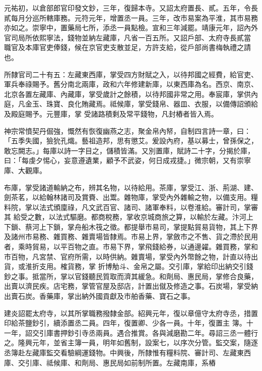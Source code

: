 \begin{pinyinscope}
 元祐初，以倉部郎官印發文鈔，三年，復歸本寺。又詔太府置長、貳。五年，令長貳每月分巡所轄庫務。元符元年，增置丞一員。三年，改市易案為平淮，其市易務亦如之。崇寧中，置藥局七所，添丞一員點檢。宣和三年減罷。靖康元年，詔內外官司局所依熙寧法，錢物並納左藏庫，凡省一百五所。又詔戶部、太府寺長貳當
 職官及本庫官吏俸錢，候在京官吏支散並足，方許支給，從戶部尚書梅執禮之請也。



 所隸官司二十有五：左藏東西庫，掌受四方財賦之入，以待邦國之經費，給官吏、軍兵奉祿賜予。舊分南北兩庫，政和六年修建新庫，以東西庫為名。西京、南京、北京各置左藏庫、內藏庫，掌受歲計之餘積，以待邦國非常之用。奉宸庫，掌供內庭，凡金玉、珠寶、良化賄藏焉。祗候庫，掌受錢帛、器皿、衣服，以備傳詔頒給及殿庭賜予。元豐庫，掌
 受諸路積剩及常平錢物，凡封樁者皆入焉。



 神宗常憤契丹倔強，慨然有恢復幽燕之志，聚金帛內帑，自制四言詩一章，曰：「五季失國，獫狁孔熾。藝祖造邦，思有懲艾。爰設內府，基以募士，曾孫保之，敢忘闕志。」每庫以詩一字目之，儲積皆滿。又別置庫，賦詩二十字，分揭於庫，曰：「每虔夕惕心，妄意遵遺業，顧予不武姿，何日成戎捷。」微宗朝，又有崇寧庫、大觀庫。



 布庫，掌受諸道輸納之布，辨其名物，以待給用。茶庫，掌受江、浙、荊湖、建、劍茶茗，以給翰林諸司及賞賚、出鬻。雜物庫，掌受內外雜輸之物，以備支用。糧料院，掌以法式頒廩祿，凡文武百官、諸司、諸軍奉料，以卷淮給。審計司，掌審其
 給受之數，以法式驅磨。都商稅務，掌收京城商旅之算，以輸於左藏。汴河上下鎖、蔡河上下鎖，掌舟船木筏之徵。都提舉市易司，掌提點貿易貨物，其上下界及諸州市易務、雜買務、雜賣場皆隸焉。市易上界，掌斂市之不售、貨之滯於民用者，乘時貿易，以平百物之直。市易下界，掌飛錢給券，以通邊糴。雜買務，掌和市百物，凡宮禁、官府所需，以時供納。雜賣場，掌受內外幣餘之物，計直以待出貨，或淮折支用。榷貨務，掌
 折博觔斗、金帛之屬。交引庫，掌給印出納交引錢鈔之事。抵當所，掌以官錢聽民質取而濟其緩急。和劑局、惠民局，掌修合良藥，出賣以濟民疾。店宅務，掌管官屋及邸店，計置出僦及修造之事。石炭場，掌受納出賣石炭。香藥庫，掌出納外國貢獻及市舶香藥、寶石之事。



 建炎詔罷太府寺，以其所掌職務撥隸金部。紹興元年，復以章億守太府寺丞，措置印給茶鹽鈔引，續添置丞二員。四年，復置卿、少各一員。十年，復置主
 簿。十一年，詔交引庫書押鈔引寺丞兩員。遇合推賞。各與減磨勘二年。尋詔三丞一體行之。隆興元年，並省主簿一員，明年如舊制，設案七，以序次分管。監交案，隨逐丞簿赴左藏庫監交看驗綱運錢物。中興後，所隸惟有糧料院、審計司、左藏東西庫、交引庫、祗候庫、和劑局、惠民局如前制所置。左藏南庫，系樁




\end{pinyinscope}
